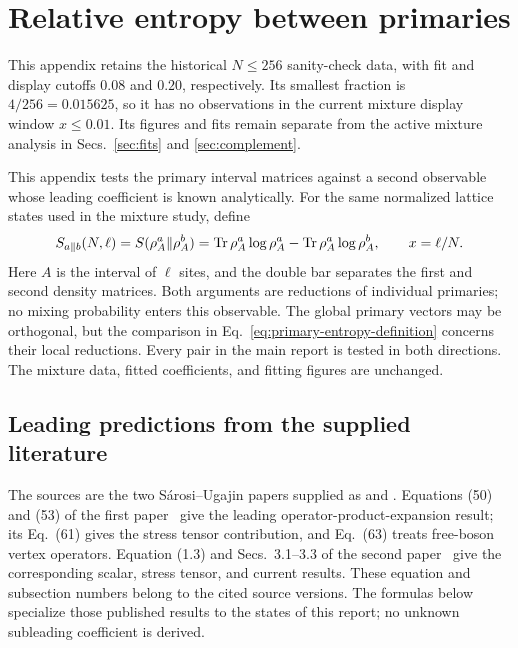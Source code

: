\clearpage
\section{Relative entropy between primaries}
\label{sec:primary-relative-entropy}
This appendix retains the historical $N\leq256$ sanity-check data,
with fit and display cutoffs $0.08$ and $0.20$, respectively. Its
smallest fraction is $4/256=0.015625$, so it has no observations in
the current mixture display window $x\leq0.01$. Its figures and fits
remain separate from the active mixture analysis in Secs.~\ref{sec:fits}
and \ref{sec:complement}.

This appendix tests the primary interval matrices against a second
observable whose leading coefficient is known analytically. For the same
normalized lattice states used in the mixture study, define
\begin{equation}
 S_{a\Vert b}(N,\ell)
 =S(\rho_A^a\Vert\rho_A^b)
 =\operatorname{Tr}\rho_A^a\log\rho_A^a-\operatorname{Tr}\rho_A^a\log\rho_A^b,
 \qquad x=\ell/N.
 \label{eq:primary-entropy-definition}
\end{equation}
Here $A$ is the interval of $\ell$ sites, and the double bar separates the
first and second density matrices. Both arguments are reductions of
individual primaries; no mixing probability enters this observable.
The global primary vectors may be orthogonal, but the comparison in
Eq.~\eqref{eq:primary-entropy-definition} concerns their local reductions.
Every pair in the main report is tested in both directions. The mixture
data, fitted coefficients, and fitting figures are unchanged.

\subsection{Leading predictions from the supplied literature}
\label{sec:primary-analytic}
The sources are the two S\'{a}rosi--Ugajin papers supplied as
 and
.
Equations (50) and (53) of the first paper~\cite{Sarosi} give the
leading operator-product-expansion result; its Eq.~(61) gives the stress
tensor contribution, and Eq.~(63) treats free-boson vertex operators.
Equation (1.3) and Secs.~3.1--3.3 of the second
paper~\cite{SarosiHigher} give the corresponding scalar, stress tensor,
and current results. These equation and subsection numbers belong to
the cited source versions. The formulas below specialize those published
results to the states of this report; no unknown subleading coefficient
is derived.

